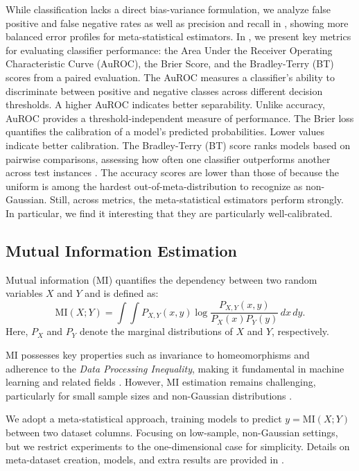 While classification lacks a direct bias-variance formulation, we analyze false positive and false negative rates as well as precision and recall in , showing more balanced error profiles for meta-statistical estimators. In , we present key metrics for evaluating classifier performance: the Area Under the Receiver Operating Characteristic Curve (AuROC), the Brier Score, and the Bradley-Terry (BT) scores from a paired evaluation.
The AuROC measures a classifier's ability to discriminate between positive and negative classes across different decision thresholds. A higher AuROC indicates better separability. Unlike accuracy, AuROC provides a threshold-independent measure of performance. The Brier loss \cite{brier1950verification} quantifies the calibration of a model’s predicted probabilities. Lower values indicate better calibration. The Bradley-Terry (BT) score \cite{bradley1952rank,NIPS2004_825f9cd5} ranks models based on pairwise comparisons, assessing how often one classifier outperforms another across test instances \cite{peyrard-etal-2021-better,colombo-etal-2023-glass}. The accuracy scores are lower than those of  because the uniform is among the hardest out-of-meta-distribution to recognize as non-Gaussian. Still, across metrics, the meta-statistical estimators perform strongly. In particular, we find it interesting that they are particularly well-calibrated.


\subsection{Mutual Information Estimation}
Mutual information (MI) quantifies the dependency between two random variables \(X\) and \(Y\) and is defined as:
\[
\mathrm{MI}(X; Y) = \int \int P_{X,Y}(x, y) \log \frac{P_{X,Y}(x, y)}{P_X(x) P_Y(y)} \, dx \, dy.
\]
Here, \(P_X\) and \(P_Y\) denote the marginal distributions of \(X\) and \(Y\), respectively.

MI possesses key properties such as invariance to homeomorphisms and adherence to the \textit{Data Processing Inequality}, making it fundamental in machine learning and related fields \cite{inv_bottleneck, pmlr-v80-belghazi18a, repr_learning, tishby2000informationbottleneckmethod}. However, MI estimation remains challenging, particularly for small sample sizes and non-Gaussian distributions \cite{song2020understandinglimitationsvariationalmutual, pmlr-v108-mcallester20a, NEURIPS2023_36b80eae}. 

We adopt a meta-statistical approach, training models to predict \( y = \mathrm{MI}(X; Y) \) between two dataset columns. Focusing on low-sample, non-Gaussian settings, but we restrict experiments to the one-dimensional case for simplicity. Details on meta-dataset creation, models, and extra results are provided in .


